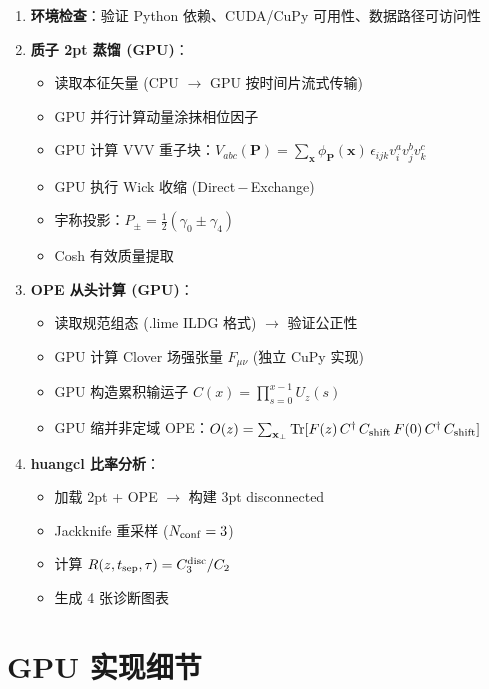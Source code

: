 \documentclass[11pt,a4paper]{article}
\begin{document}
\begin{enumerate}[leftmargin=*,label={\textbf{Step~\arabic*}:}]
  \item \textbf{环境检查}：验证 Python 依赖、CUDA/CuPy 可用性、数据路径可访问性
  \item \textbf{质子 2pt 蒸馏 (GPU)}：
    \begin{itemize}
      \item 读取本征矢量 (CPU $\to$ GPU 按时间片流式传输)
      \item GPU 并行计算动量涂抹相位因子
      \item GPU 计算 VVV 重子块：$V_{abc}(\mathbf{P}) = \sum_{\mathbf{x}} \phi_{\mathbf{P}}(\mathbf{x})\,
        \epsilon_{ijk} v_i^a v_j^b v_k^c$
      \item GPU 执行 Wick 收缩 (Direct\,$-$\,Exchange)
      \item 宇称投影：$P_{\pm} = \frac{1}{2}(\gamma_0 \pm \gamma_4)$
      \item Cosh 有效质量提取
    \end{itemize}
  \item \textbf{OPE 从头计算 (GPU)}：
    \begin{itemize}
      \item 读取规范组态 (.lime ILDG 格式) $\to$ 验证公正性
      \item GPU 计算 Clover 场强张量 $F_{\mu\nu}$ (独立 CuPy 实现)
      \item GPU 构造累积输运子 $C(x) = \prod_{s=0}^{x-1} U_z(s)$
      \item GPU 缩并非定域 OPE：$O(z) = \sum_{\mathbf{x}_\perp} \operatorname{Tr}[F(z)\,C^{\dag}\,
        C_{\rm shift}\,F(0)\,C^{\dag}\,C_{\rm shift}]$
    \end{itemize}
  \item \textbf{huangcl 比率分析}：
    \begin{itemize}
      \item 加载 2pt + OPE $\to$ 构建 3pt disconnected
      \item Jackknife 重采样 ($N_{\rm conf}=3$)
      \item 计算 $R(z, t_{\rm sep}, \tau) = C_3^{\rm disc}/C_2$
      \item 生成 4 张诊断图表
    \end{itemize}
\end{enumerate}

\section{GPU 实现细节}
\end{document}
